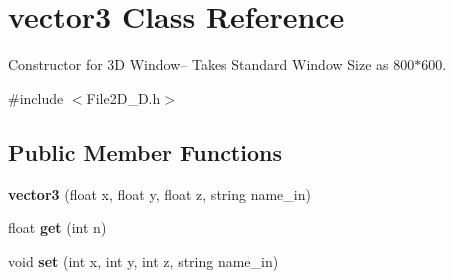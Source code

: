 \hypertarget{classvector3}{}\section{vector3 Class Reference}
\label{classvector3}


Constructor for 3D Window-- Takes Standard Window Size as 800$\ast$600.  




{\ttfamily \#include $<$File2\+D\+\_\+D.\+h$>$}

\subsection*{Public Member Functions}
\begin{DoxyCompactItemize}
\item 
\mbox{\label{classvector3_a29d7e4af3753355d2391bba4dac3d939}} 
{\bfseries vector3} (float x, float y, float z, string name\+\_\+in)
\item 
\mbox{\label{classvector3_a3fbac18cb559267635999da0da5a67bf}} 
float {\bfseries get} (int n)
\item 
\mbox{\label{classvector3_acd26a216dc5fd1e47afb9d8a350f36eb}} 
void {\bfseries set} (int x, int y, int z, string name\+\_\+in)
\end{DoxyCompactItemize}
